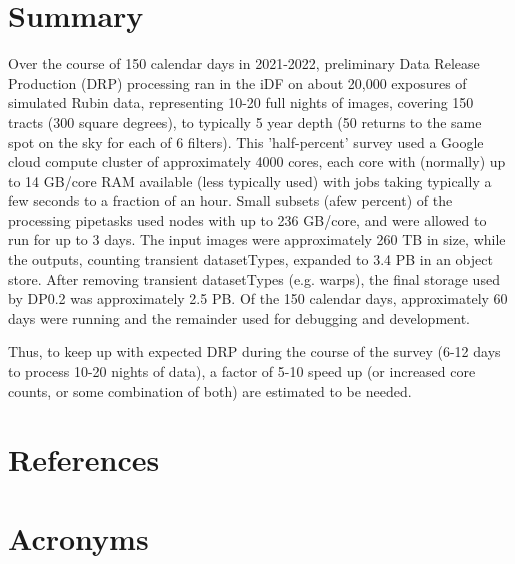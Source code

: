 \documentclass[OPS,authoryear,toc]{lsstdoc}
\begin{document}
\section{Summary}
Over the course of 150 calendar days in 2021-2022, preliminary Data
Release Production (DRP) processing ran in the iDF on about 20,000
exposures of simulated Rubin data, representing 10-20 full nights of
images, covering 150 tracts (300 square degrees), to typically 5 year
depth (50 returns to the same spot on the sky for each of 6 filters).
This 'half-percent' survey used a Google cloud compute cluster of
approximately 4000 cores, each core with (normally) up to 14 GB/core
RAM available (less typically used) with jobs taking typically a few
seconds to a fraction of an hour.  Small subsets (afew percent) of the
processing pipetasks used nodes with up to 236 GB/core, and were
allowed to run for up to 3 days.  The input images were approximately
260 TB in size, while the outputs, counting transient datasetTypes,
expanded to 3.4 PB in an object store.  After removing transient
datasetTypes (e.g. warps), the final storage used by DP0.2 was
approximately 2.5 PB.  Of the 150 calendar days, approximately 60 days
were running and the remainder used for debugging and development.

Thus, to keep up with expected DRP during the course of the survey
(6-12 days to process 10-20 nights of data), a factor of 5-10 speed up
(or increased core counts, or some combination of both) are estimated
to be needed.   


\appendix
\section{References} \label{sec:bib}
\renewcommand{\refname}{} %


\section{Acronyms} \label{sec:acronyms}

\end{document}
